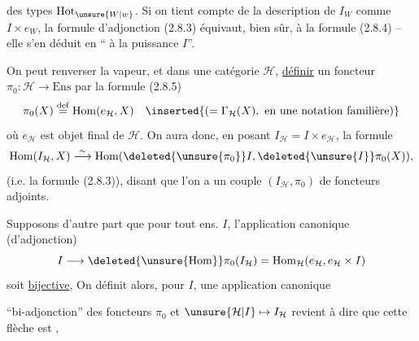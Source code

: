 
des types $\mathrm{Hot}_{\unsure{W|w}}$. Si on tient compte de la description de $I_W$ comme $I\times e_W$, la formule d'adjonction  (2.8.3) équivaut, bien sûr, à la formule (2.8.4) -- elle s'en déduit en `` à la puissance $I$''.

On peut renverser la vapeur, et dans une catégorie  $\mathcal H$, \uline{définir} un foncteur $\pi_0:\mathcal H\longrightarrow\mathrm{Ens}$ par la formule (2.8.5)
\[
\pi_0(X)\overset{\mathrm{def}}{=}\mathrm{Hom}(e_{\mathcal H},X)
\quad\inserted{(=\Gamma_{\mathcal H}(X),\ \text{en une notation familière})}
\]
où $e_{\mathcal H}$ est  objet final de $\mathcal H$. On aura donc, en posant $I_{\mathcal H}=I\times e_{\mathcal H}$, la formule
\[
\mathrm{Hom}(I_{\mathcal H},X)\overset{\sim}{\longrightarrow}\mathrm{Hom}(\deleted{\unsure{\pi_0}}I,\deleted{\unsure{I}}\pi_0(X)),
\]
(i.e. la formule (2.8.3)), disant que l'on a un couple $(I_{\mathcal H},\pi_0)$ de foncteurs adjoints.

Supposons d'autre part que pour tout ens. $I$, l'application canonique (d'adjonction)
\[
 I\longrightarrow\deleted{\unsure{\mathrm{Hom}}}\pi_0(I_{\mathcal H})=\mathrm{Hom}_{\mathcal H}(e_{\mathcal H},e_{\mathcal H}\times I)
\]
soit \uline{bijective}, On définit alors, pour  $I$, une application canonique

 ``bi-adjonction'' des foncteurs $\pi_0$ et $\unsure{\mathcal H|I}\mapsto I_{\mathcal H}$ revient à dire que cette flèche est ,

